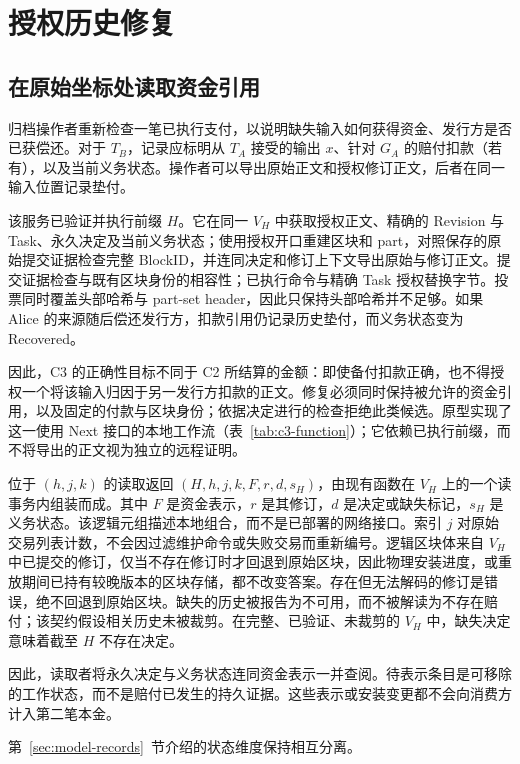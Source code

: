 \section{授权历史修复}
\label{sec:history}

\subsection{在原始坐标处读取资金引用}
\label{sec:protocol-reader}

归档操作者重新检查一笔已执行支付，以说明缺失输入如何获得资金、发行方是否已获偿还。对于 $T_B$，记录应标明从 $T_A$ 接受的输出 $x$、针对 $G_A$ 的赔付扣款（若有），以及当前义务状态。操作者可以导出原始正文和授权修订正文，后者在同一输入位置记录垫付。

该服务已验证并执行前缀 $H$。它在同一 $V_H$ 中获取授权正文、精确的 Revision 与 Task、永久决定及当前义务状态；使用授权开口重建区块和 part，对照保存的原始提交证据检查完整 BlockID，并连同决定和修订上下文导出原始与修订正文。提交证据检查与既有区块身份的相容性；已执行命令与精确 Task 授权替换字节。投票同时覆盖头部哈希与 part-set header，因此只保持头部哈希并不足够。如果 Alice 的来源随后偿还发行方，扣款引用仍记录历史垫付，而义务状态变为 Recovered。

因此，C3 的正确性目标不同于 C2 所结算的金额：即使备付扣款正确，也不得授权一个将该输入归因于另一发行方扣款的正文。修复必须同时保持被允许的资金引用，以及固定的付款与区块身份；依据决定进行的检查拒绝此类候选。原型实现了这一使用 Next 接口的本地工作流（表~\ref{tab:c3-function}）；它依赖已执行前缀，而不将导出的正文视为独立的远程证明。

位于 $(h,j,k)$ 的读取返回 $(H,h,j,k,F,r,d,s_H)$，由现有函数在 $V_H$ 上的一个读事务内组装而成。其中 $F$ 是资金表示，$r$ 是其修订，$d$ 是决定或缺失标记，$s_H$ 是义务状态。该逻辑元组描述本地组合，而不是已部署的网络接口。索引 $j$ 对原始交易列表计数，不会因过滤维护命令或失败交易而重新编号。逻辑区块体来自 $V_H$ 中已提交的修订，仅当不存在修订时才回退到原始区块，因此物理安装进度，或重放期间已持有较晚版本的区块存储，都不改变答案。存在但无法解码的修订是错误，绝不回退到原始区块。缺失的历史被报告为不可用，而不被解读为不存在赔付；该契约假设相关历史未被裁剪。在完整、已验证、未裁剪的 $V_H$ 中，缺失决定意味着截至 $H$ 不存在决定。



因此，读取者将永久决定与义务状态连同资金表示一并查阅。待表示条目是可移除的工作状态，而不是赔付已发生的持久证据。这些表示或安装变更都不会向消费方计入第二笔本金。

第~\ref{sec:model-records}~节介绍的状态维度保持相互分离。

